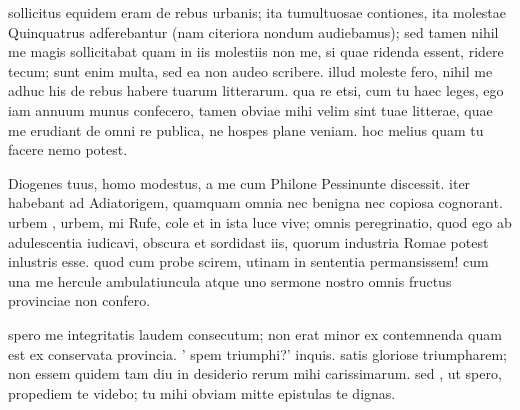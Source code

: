 


 sollicitus equidem eram de rebus urbanis; ita tumultuosae contiones, ita molestae Quinquatrus adferebantur (nam citeriora nondum audiebamus); sed tamen nihil me magis sollicitabat quam in iis molestiis non me, si quae ridenda essent, ridere tecum; sunt enim multa, sed ea non audeo scribere. illud moleste fero, nihil me adhuc his de rebus habere tuarum litterarum. qua re etsi, cum tu haec leges, ego iam annuum munus confecero, tamen obviae mihi velim sint tuae litterae, quae me erudiant de omni re publica, ne hospes plane veniam. hoc melius quam tu facere nemo potest.

 Diogenes tuus, homo modestus, a me cum Philone Pessinunte discessit. iter habebant ad Adiatorigem, quamquam omnia nec benigna nec copiosa cognorant. urbem , urbem, mi Rufe, cole et in ista luce vive; omnis peregrinatio, quod ego ab adulescentia iudicavi, obscura et sordidast iis, quorum industria Romae potest inlustris esse. quod cum probe scirem, utinam in sententia permansissem! cum una me hercule ambulatiuncula atque uno sermone nostro omnis fructus provinciae non confero.

 spero me integritatis laudem consecutum; non erat minor ex contemnenda quam est ex conservata provincia. ' spem triumphi?' inquis. satis gloriose triumpharem; non essem quidem tam diu in desiderio rerum mihi carissimarum. sed , ut spero, propediem te videbo; tu mihi obviam mitte epistulas te dignas.
